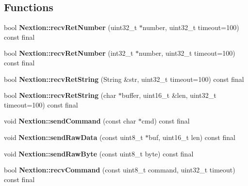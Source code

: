 \subsection*{Functions}
\begin{DoxyCompactItemize}
\item 
\hypertarget{group___core_a_p_i_gab90a0462b162cfe773cf670e9cba09a3}{}bool {\bfseries Nextion\+::recv\+Ret\+Number} (uint32\+\_\+t $\ast$number, uint32\+\_\+t timeout=100) const final\label{group___core_a_p_i_gab90a0462b162cfe773cf670e9cba09a3}

\item 
\hypertarget{group___core_a_p_i_ga9b357b43491efa0830dc14d54a1e1ef9}{}bool {\bfseries Nextion\+::recv\+Ret\+Number} (int32\+\_\+t $\ast$number, uint32\+\_\+t timeout=100) const final\label{group___core_a_p_i_ga9b357b43491efa0830dc14d54a1e1ef9}

\item 
\hypertarget{group___core_a_p_i_ga69596aef9e363b92a0210949180fb27e}{}bool {\bfseries Nextion\+::recv\+Ret\+String} (String \&str, uint32\+\_\+t timeout=100) const final\label{group___core_a_p_i_ga69596aef9e363b92a0210949180fb27e}

\item 
\hypertarget{group___core_a_p_i_ga1c354a9e3e7ad9d095fdba2eb342f1b2}{}bool {\bfseries Nextion\+::recv\+Ret\+String} (char $\ast$buffer, uint16\+\_\+t \&len, uint32\+\_\+t timeout=100) const final\label{group___core_a_p_i_ga1c354a9e3e7ad9d095fdba2eb342f1b2}

\item 
\hypertarget{group___core_a_p_i_gaef3f701010fd275b1034be238e392f73}{}void {\bfseries Nextion\+::send\+Command} (const char $\ast$cmd) const final\label{group___core_a_p_i_gaef3f701010fd275b1034be238e392f73}

\item 
\hypertarget{group___core_a_p_i_ga431cca1fc0892f33be2db4e2999b3a42}{}void {\bfseries Nextion\+::send\+Raw\+Data} (const uint8\+\_\+t $\ast$buf, uint16\+\_\+t len) const final\label{group___core_a_p_i_ga431cca1fc0892f33be2db4e2999b3a42}

\item 
\hypertarget{group___core_a_p_i_ga1f89c0c7dc323de9c539d7bf9af5556c}{}void {\bfseries Nextion\+::send\+Raw\+Byte} (const uint8\+\_\+t byte) const final\label{group___core_a_p_i_ga1f89c0c7dc323de9c539d7bf9af5556c}

\item 
\hypertarget{group___core_a_p_i_gaac885132f695b6773b20b8853e924e37}{}bool {\bfseries Nextion\+::recv\+Command} (const uint8\+\_\+t command, uint32\+\_\+t timeout) const final\label{group___core_a_p_i_gaac885132f695b6773b20b8853e924e37}


\end{DoxyCompactItemize}
